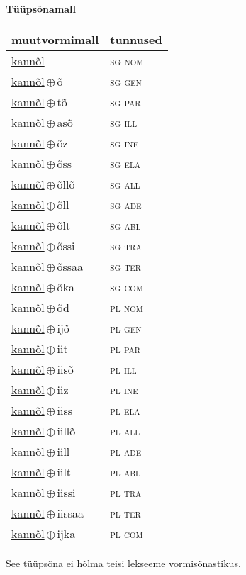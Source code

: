 

\vspace{3.5em}
\noindent \begin{minipage}{\textwidth}
\noindent \textbf{Tüüpsõnamall \,}\\

\begin{sideways}
\begin{tabular}{l l}
muutvormimall & tunnused \\
\hline
\underline{kannõl} & \textsc{ sg nom } \\
\underline{kannõl}\,$\oplus$\,õ & \textsc{ sg gen } \\
\underline{kannõl}\,$\oplus$\,tõ & \textsc{ sg par } \\
\underline{kannõl}\,$\oplus$\,asõ & \textsc{ sg ill } \\
\underline{kannõl}\,$\oplus$\,õz & \textsc{ sg ine } \\
\underline{kannõl}\,$\oplus$\,õss & \textsc{ sg ela } \\
\underline{kannõl}\,$\oplus$\,õllõ & \textsc{ sg all } \\
\underline{kannõl}\,$\oplus$\,õll & \textsc{ sg ade } \\
\underline{kannõl}\,$\oplus$\,õlt & \textsc{ sg abl } \\
\underline{kannõl}\,$\oplus$\,õssi & \textsc{ sg tra } \\
\underline{kannõl}\,$\oplus$\,õssaa & \textsc{ sg ter } \\
\underline{kannõl}\,$\oplus$\,õka & \textsc{ sg com } \\
\underline{kannõl}\,$\oplus$\,õd & \textsc{ pl nom } \\
\underline{kannõl}\,$\oplus$\,ijõ & \textsc{ pl gen } \\
\underline{kannõl}\,$\oplus$\,iit & \textsc{ pl par } \\
\underline{kannõl}\,$\oplus$\,iisõ & \textsc{ pl ill } \\
\underline{kannõl}\,$\oplus$\,iiz & \textsc{ pl ine } \\
\underline{kannõl}\,$\oplus$\,iiss & \textsc{ pl ela } \\
\underline{kannõl}\,$\oplus$\,iillõ & \textsc{ pl all } \\
\underline{kannõl}\,$\oplus$\,iill & \textsc{ pl ade } \\
\underline{kannõl}\,$\oplus$\,iilt & \textsc{ pl abl } \\
\underline{kannõl}\,$\oplus$\,iissi & \textsc{ pl tra } \\
\underline{kannõl}\,$\oplus$\,iissaa & \textsc{ pl ter } \\
\underline{kannõl}\,$\oplus$\,ijka & \textsc{ pl com } \\
\end{tabular}
\end{sideways}
\label{tab:tüüpsõnamall-kannõl}

\end{minipage}

 
\vspace{1em}
\noindent See tüüpsõna ei hõlma teisi lekseeme vormi\-sõnastikus.
